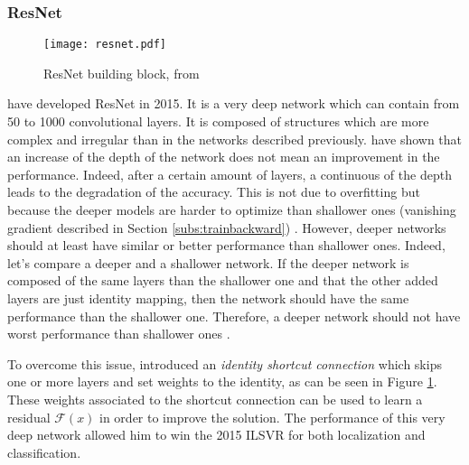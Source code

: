 \subsubsection{ResNet}
%
\begin{figure}
    \centering
    \texttt{[image: resnet.pdf]}
    \caption{ResNet building block, from \cite{he_deep_2016}}
    \label{fig:resnet}
\end{figure}
%
\textcite{he_deep_2016} have developed ResNet in 2015. It is a very deep network which can contain from 50 to 1000 convolutional layers. It is composed of structures which are more complex and irregular than in the networks described previously. \textcite{he_deep_2016} have shown that an increase of the depth of the network does not mean an improvement in the performance. Indeed, after a certain amount of layers, a continuous of the depth leads to the degradation of the accuracy. This is not due to overfitting but because the deeper models are harder to optimize than shallower ones (vanishing gradient described in Section \ref{subs:trainbackward}) \cite{matteucci_artificial_2019}. However, deeper networks should at least have similar or better performance than shallower ones. Indeed, let’s compare a deeper and a shallower network. If the deeper network is composed of the same layers than the shallower one and that the other added layers are just identity mapping, then the network should have the same performance than the shallower one. Therefore, a deeper network should not have worst performance than shallower ones \cite{matteucci_artificial_2019}.

To overcome this issue, \textcite{he_deep_2016} introduced an \textit{identity shortcut connection} which skips one or more layers and set weights to the identity, as can be seen in Figure \ref{fig:resnet}. These weights associated to the shortcut connection can be used to learn a residual $\mathcal{F}(x)$ in order to improve the solution. The performance of this very deep network allowed him to win the 2015 ILSVR for both localization and classification.
%
